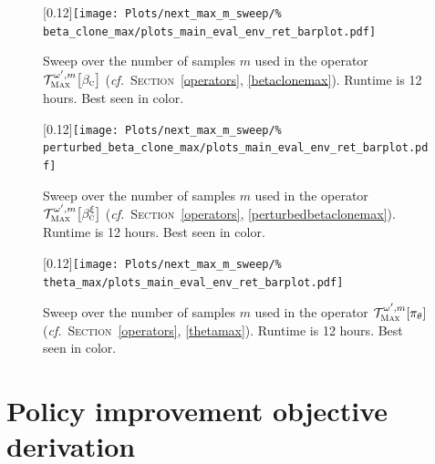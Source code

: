 \begin{figure}[H]
  \center\scalebox{0.12}[0.12]{\texttt{[image: Plots/next\_max\_m\_sweep/\%
  beta\_clone\_max/plots\_main\_eval\_env\_ret\_barplot.pdf]}}
  \caption{Sweep over the number of samples $m$ used in the operator
  $\mathcal{T}_\textsc{Max}^{\omega', m}\big[\beta_\textsc{c}\big]$
  (\textit{cf.}~\textsc{Section}~\ref{operators}, \ref{betaclonemax}).
  Runtime is 12 hours. Best seen in color.}
  \label{betaclonemaxm:barplot}
\end{figure}
\begin{figure}[H]
  \center\scalebox{0.12}[0.12]{\texttt{[image: Plots/next\_max\_m\_sweep/\%
  perturbed\_beta\_clone\_max/plots\_main\_eval\_env\_ret\_barplot.pdf]}}
  \caption{Sweep over the number of samples $m$ used in the operator
  $\mathcal{T}_\textsc{Max}^{\omega', m}\big[\beta_\textsc{c}^\xi\big]$
  (\textit{cf.}~\textsc{Section}~\ref{operators}, \ref{perturbedbetaclonemax}).
  Runtime is 12 hours. Best seen in color.}
  \label{perturbedbetaclonemaxm:barplot}
\end{figure}
\begin{figure}[H]
  \center\scalebox{0.12}[0.12]{\texttt{[image: Plots/next\_max\_m\_sweep/\%
  theta\_max/plots\_main\_eval\_env\_ret\_barplot.pdf]}}
  \caption{Sweep over the number of samples $m$ used in the operator
  $\mathcal{T}_\textsc{Max}^{\omega', m}[\pi_\theta]$
  (\textit{cf.}~\textsc{Section}~\ref{operators}, \ref{thetamax}).
  Runtime is 12 hours. Best seen in color.}
  \label{thetamaxm:barplot}
\end{figure}

\section{Policy improvement objective derivation}
\label{agentobjectivedetail}

